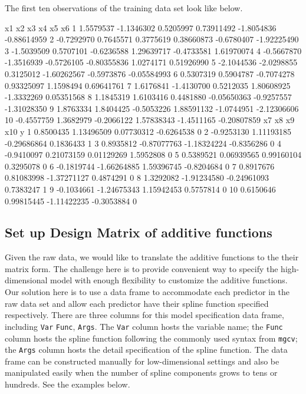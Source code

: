 \documentclass[
]{jss}
\begin{document}
The first ten observations of the training data set look like below.

\begin{CodeChunk}
\begin{CodeOutput}
           x1         x2         x3          x4         x5          x6
1   1.5579537 -1.1346302  0.5205997  0.73911492 -1.8054836 -0.88614959
2  -0.7292970  0.7645571  0.3775619  0.38660873 -0.6780407 -1.92225490
3  -1.5039509  0.5707101 -0.6236588  1.29639717 -0.4733581  1.61970074
4  -0.5667870 -1.3516939 -0.5726105 -0.80355836  1.0274171  0.51926990
5  -2.1044536 -2.0298855  0.3125012 -1.60262567 -0.5973876 -0.05584993
6   0.5307319  0.5904787 -0.7074278  0.93325097  1.1598494  0.69641761
7   1.6176841 -1.4130700  0.5212035  1.80608925 -1.3332269  0.05351568
8   1.1845319  1.6103416  0.4481880 -0.05650363 -0.9257557 -1.31028350
9   1.8763334  1.8404425 -0.5053226  1.88591132 -1.0744951 -2.12306606
10 -0.4557759  1.3682979 -0.2066122  1.57838343 -1.4511165 -0.20807859
           x7          x8          x9        x10 y
1   0.8500435  1.13496509  0.07730312 -0.6264538 0
2  -0.9253130  1.11193185 -0.29686864  0.1836433 1
3   0.8935812 -0.87077763 -1.18324224 -0.8356286 0
4  -0.9410097  0.21073159  0.01129269  1.5952808 0
5   0.5389521  0.06939565  0.99160104  0.3295078 0
6  -0.1819744 -1.66264885  1.59396745 -0.8204684 0
7   0.8917676  0.81083998 -1.37271127  0.4874291 0
8   1.3292082 -1.91234580 -0.24961093  0.7383247 1
9  -0.1034661 -1.24675343  1.15942453  0.5757814 0
10  0.6150646  0.99815445 -1.11422235 -0.3053884 0
\end{CodeOutput}
\end{CodeChunk}

\subsection{Set up Design Matrix of additive functions}

Given the raw data, we would like to translate the additive functions to
the their matrix form. The challenge here is to provide convenient way
to specify the high-dimensional model with enough flexibility to
customize the additive functions. Our solution here is to use a data
frame to accommodate each predictor in the raw data set and allow each
predictor have their spline function specified respectively. There are
three columns for this model specification data frame, including
\texttt{Var} \texttt{Func}, \texttt{Args}. The \texttt{Var} column hosts
the variable name; the \texttt{Func} column hosts the spline function
following the commonly used syntax from \texttt{mgcv}; the \texttt{Args}
column hosts the detail specification of the spline function. The data
frame can be constructed manually for low-dimensional settings and also
be manipulated easily when the number of spline components grows to tens
or hundreds. See the examples below.
\end{document}
